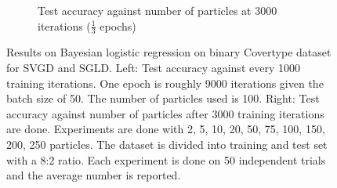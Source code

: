 \begin{figure}[ht]
\begin{subfigure}[b]{0.45\textwidth}
		\caption{Test accuracy against number of particles at 3000 iterations ($\frac{1}{3}$ epochs)}
		\label{fig:acc_par}
	\end{subfigure}
	\caption{Results on Bayesian logistic regression on binary Covertype dataset for SVGD and SGLD. Left: Test accuracy against every 1000 training iterations. One epoch is roughly 9000 iterations given the batch size of 50. The number of particles used is 100. Right: Test accuracy against number of particles after 3000 training iterations are done. Experiments are done with 2, 5, 10, 20, 50, 75, 100, 150, 200, 250 particles. The dataset is divided into training and test set with a 8:2 ratio. Each experiment is done on 50 independent trials and the average number is reported.}
	\label{fig:covertype}
\end{figure}